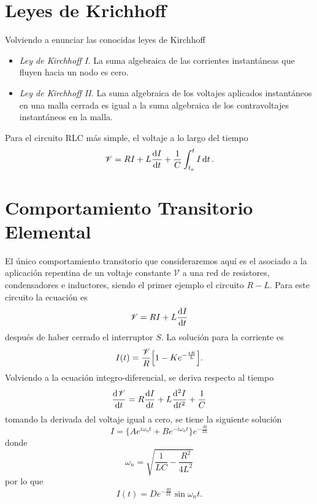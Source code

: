 \section{Leyes de Krichhoff}
Volviendo a enunciar las conocidas leyes de Kirchhoff
\begin{itemize}
    \item \textit{Ley de Kirchhoff I.} La suma algebraica de las corrientes instantáneas que fluyen hacia un nodo es cero.
    \item \textit{Ley de Kirchhoff II.} La suma algebraica de los voltajes aplicados instantáneos en una malla cerrada es igual a la suma algebraica de los contravoltajes instantáneos en la malla.
\end{itemize}
Para el circuito RLC más simple, el voltaje a lo largo del tiempo
\begin{equation}
    \mathscr{V} = RI + L\dv{I}{t} + \frac{1}{C} \int _{t_o} ^t I\dd{t}.
\end{equation}


\section{Comportamiento Transitorio Elemental}
El único comportamiento transitorio que consideraremos aquí es el asociado a la aplicación repentina de un voltaje constante $\mathscr{V}$ a una red de resistores, condensadores e inductores, siendo el primer ejemplo el circuito $R-L$. Para este circuito la ecuación es
\begin{equation}
    \mathscr{V} = RI + L\dv{I}{t}
\end{equation}
después de haber cerrado el interruptor $S$. La solución para la corriente es
\begin{equation}
    I(t) = \frac{\mathscr{V}}{R} \qty[1 - Ke^{-\frac{tR}{L}}].
\end{equation}
Volviendo a la ecuación integro-diferencial, se deriva respecto al tiempo
\begin{equation}
    \dv{\mathscr{V}}{t} = R\dv{I}{t} + L\dv[2]{I}{t} + \frac{1}{C}
\end{equation}
tomando la derivada del voltaje igual a cero, se tiene la siguiente solución
\begin{equation}
    I = \{ Ae^{i\omega _n t} + Be^{-i\omega _n t} \} e^{-\frac{Rt}{2L}}
\end{equation}
donde
\begin{equation}
    \omega _n = \sqrt{\frac{1}{LC} - \frac{R^2}{4L^2}}
\end{equation}
por lo que
\begin{equation}
    I(t) = De^{-\frac{Rt}{2L}} \sin{\omega _n t}.
\end{equation}

